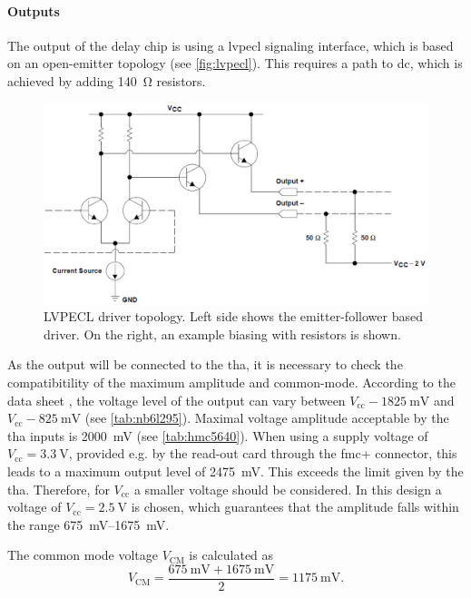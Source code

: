 \paragraph{Outputs}
The output of the delay chip is using a \gls{lvpecl} signaling interface, which is based on an open-emitter topology (see \autoref{fig:lvpecl}).
This requires a path to \gls{dc}, which is achieved by adding \SI{140}{\ohm} resistors.

\begin{figure}[tbh]
	\centering
	\includegraphics[width = \textwidth]{chap/04-work/img/lvpecl}
	\caption[LVPECL driver topology]{LVPECL driver topology. Left side shows the emitter-follower based driver. On the right, an example biasing with resistors is shown. \cite{lvpecl}}
	\label{fig:lvpecl}
\end{figure}

As the output will be connected to the \gls{tha}, it is necessary to check the compatibitility of the maximum amplitude and common-mode.
According to the data sheet \cite{NB6L295}, the voltage level of the output can vary between  $V_\text{cc} - \SI{1825}{\milli\volt}$ and $V_\text{cc} - \SI{825}{\milli\volt}$ (see \autoref{tab:nb6l295}).
Maximal voltage amplitude acceptable by the \gls{tha} inputs is \SI{2000}{\milli\volt} (see \autoref{tab:hmc5640}).
When using a supply voltage of $V_\text{cc} = \SI{3.3}{\volt}$, provided e.g. by the read-out card through the \gls{fmc}+ connector, this leads to a maximum output level of \SI{2475}{\milli\volt}.
This exceeds the limit given by the \gls{tha}.
Therefore, for $V_\text{cc}$ a smaller voltage should be considered.
In this design a voltage of $V_\text{cc} = \SI{2.5}{\volt}$ is chosen, which guarantees that the amplitude falls within the range \SIrange{675}{1675}{\milli\volt}.

The common mode voltage $V_{\text{CM}}$ is calculated as %
\begin{equation}
	V_{\text{CM}} = \frac{\SI{675}{\milli \volt} + \SI{1675}{\milli \volt}}{2} = \SI{1175}{\milli \volt}.
\end{equation}

